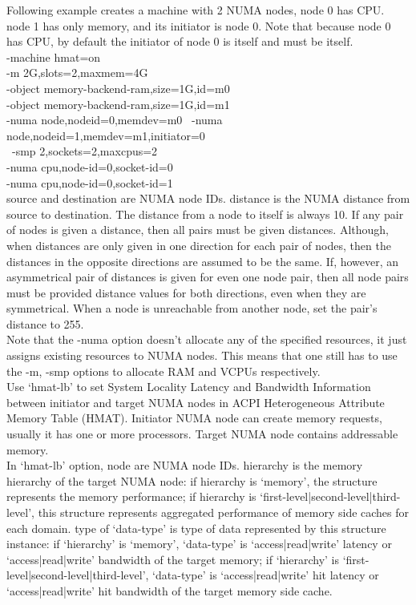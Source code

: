 \documentclass[11pt, a4paper, oneside]{article}
\theoremstyle{definition}
\begin{document}
    Following example creates a machine with 2 NUMA nodes, node 0 has CPU. node 1 has only memory, and its initiator is node 0. Note that because node 0 has CPU, by default the initiator of node 0 is itself and must be itself.\\

    -machine hmat=on \\
    -m 2G,slots=2,maxmem=4G \\
    -object memory-backend-ram,size=1G,id=m0 \\
    -object memory-backend-ram,size=1G,id=m1 \\
    -numa node,nodeid=0,memdev=m0 \
    -numa node,nodeid=1,memdev=m1,initiator=0 \\\
    -smp 2,sockets=2,maxcpus=2  \\
    -numa cpu,node-id=0,socket-id=0 \\
    -numa cpu,node-id=0,socket-id=1\\

    source and destination are NUMA node IDs. distance is the NUMA distance from source to destination. The distance from a node to itself is always 10. If any pair of nodes is given a distance, then all pairs must be given distances. Although, when distances are only given in one direction for each pair of nodes, then the distances in the opposite directions are assumed to be the same. If, however, an asymmetrical pair of distances is given for even one node pair, then all node pairs must be provided distance values for both directions, even when they are symmetrical. When a node is unreachable from another node, set the pair’s distance to 255.\\

    Note that the -numa option doesn’t allocate any of the specified resources, it just assigns existing resources to NUMA nodes. This means that one still has to use the -m, -smp options to allocate RAM and VCPUs respectively.\\

    Use ‘hmat-lb’ to set System Locality Latency and Bandwidth Information between initiator and target NUMA nodes in ACPI Heterogeneous Attribute Memory Table (HMAT). Initiator NUMA node can create memory requests, usually it has one or more processors. Target NUMA node contains addressable memory.\\

    In ‘hmat-lb’ option, node are NUMA node IDs. hierarchy is the memory hierarchy of the target NUMA node: if hierarchy is ‘memory’, the structure represents the memory performance; if hierarchy is ‘first-level|second-level|third-level’, this structure represents aggregated performance of memory side caches for each domain. type of ‘data-type’ is type of data represented by this structure instance: if ‘hierarchy’ is ‘memory’, ‘data-type’ is ‘access|read|write’ latency or ‘access|read|write’ bandwidth of the target memory; if ‘hierarchy’ is ‘first-level|second-level|third-level’, ‘data-type’ is ‘access|read|write’ hit latency or ‘access|read|write’ hit bandwidth of the target memory side cache.\\
\end{document}
